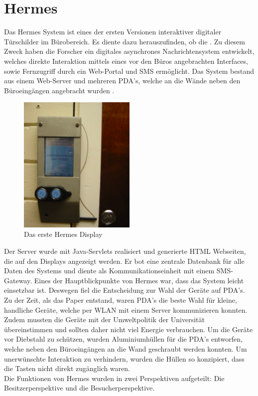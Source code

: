 \section{Hermes}
Das Hermes System \cite{cheverest:2003:paper,cheverest:2003:article,cheverest:2003:hermes,cheveres:2005:hermes-bluetooth} ist eines der ersten Versionen interaktiver digitaler Türschilder im Bürobereich.
Es diente dazu herauszufinden, ob die .
Zu diesem Zweck haben die Forscher ein digitales asynchrones Nachrichtensystem entwickelt, welches direkte Interaktion mittels eines vor den Büros angebrachten Interfaces, sowie Fernzugriff durch ein Web-Portal und SMS ermöglicht.
Das System bestand aus einem Web-Server und mehreren PDA's, welche an die Wände neben den Büroeingängen angebracht wurden .
\begin{figure}[h!]
  \centering
  \includegraphics[width=0.5\textwidth]{./img/hermes_display.png}
  \caption{Das erste Hermes Display \cite{cheverest:2003:paper}}
  \label{img:hermesDisplay}
\end{figure}
Der Server wurde mit Java-Servlets realisiert und generierte HTML Webseiten, die auf den Displays angezeigt werden. Er bot eine zentrale Datenbank für alle Daten des Systems und diente als Kommunikationseinheit mit einem SMS-Gateway.
Eines der Hauptblickpunkte von Hermes war, dass das System leicht einsetzbar ist. Deswegen fiel die Entscheidung zur Wahl der Geräte auf PDA's. Zu der Zeit, als das Paper entstand, waren PDA's die beste Wahl für kleine, handliche Geräte, welche per WLAN mit einem Server kommunizieren konnten. Zudem mussten die Geräte mit der Umweltpolitik der Universität übereinstimmen und sollten daher nicht viel Energie verbrauchen.
Um die Geräte vor Diebstahl zu schützen, wurden Aluminiumhüllen für die PDA's entworfen, welche neben den Büroeingängen an die Wand geschraubt werden konnten. Um unerwünschte Interaktion zu verhindern, wurden die Hüllen so konzipiert, dass die Tasten nicht direkt zugänglich waren.
\\
Die Funktionen von Hermes wurden in zwei Perspektiven aufgeteilt: Die Besitzerperspektive und die Besucherperspektive.
